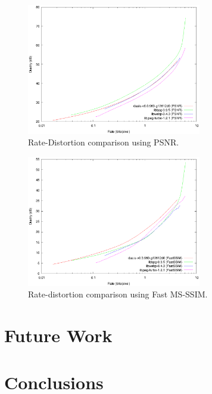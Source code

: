 \documentclass[conference, 10pt]{IEEEtran}
\begin{document}
\begin{figure}[h]
\begin{center}
\noindent
  \includegraphics[width=3in]{pcs2015-psnr}
  \caption{Rate-Distortion comparison using PSNR.}\label{fig:psnr}
\end{center}
\end{figure}

\begin{figure}[h]
\begin{center}
\noindent
  \includegraphics[width=3in]{pcs2015-fastssim}
  \caption{Rate-distortion comparison using Fast MS-SSIM.}\label{fig:fastssim}
\end{center}
\end{figure}




\section{Future Work}

\section{Conclusions}
\end{document}
